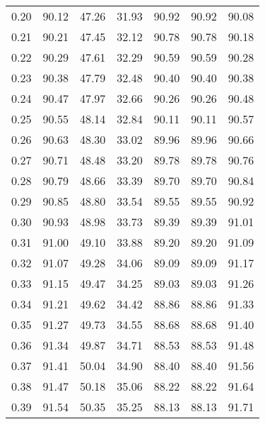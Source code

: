 \begin{tabular}{|c|c|c|c|c|c|c|}
      0.20 &     90.12 &     47.26 &      31.93 &   90.92 &      90.92 &         90.08 \\
      0.21 &     90.21 &     47.45 &      32.12 &   90.78 &      90.78 &         90.18 \\
      0.22 &     90.29 &     47.61 &      32.29 &   90.59 &      90.59 &         90.28 \\
      0.23 &     90.38 &     47.79 &      32.48 &   90.40 &      90.40 &         90.38 \\
      0.24 &     90.47 &     47.97 &      32.66 &   90.26 &      90.26 &         90.48 \\
      0.25 &     90.55 &     48.14 &      32.84 &   90.11 &      90.11 &         90.57 \\
      0.26 &     90.63 &     48.30 &      33.02 &   89.96 &      89.96 &         90.66 \\
      0.27 &     90.71 &     48.48 &      33.20 &   89.78 &      89.78 &         90.76 \\
      0.28 &     90.79 &     48.66 &      33.39 &   89.70 &      89.70 &         90.84 \\
      0.29 &     90.85 &     48.80 &      33.54 &   89.55 &      89.55 &         90.92 \\
      0.30 &     90.93 &     48.98 &      33.73 &   89.39 &      89.39 &         91.01 \\
      0.31 &     91.00 &     49.10 &      33.88 &   89.20 &      89.20 &         91.09 \\
      0.32 &     91.07 &     49.28 &      34.06 &   89.09 &      89.09 &         91.17 \\
      0.33 &     91.15 &     49.47 &      34.25 &   89.03 &      89.03 &         91.26 \\
      0.34 &     91.21 &     49.62 &      34.42 &   88.86 &      88.86 &         91.33 \\
      0.35 &     91.27 &     49.73 &      34.55 &   88.68 &      88.68 &         91.40 \\
      0.36 &     91.34 &     49.87 &      34.71 &   88.53 &      88.53 &         91.48 \\
      0.37 &     91.41 &     50.04 &      34.90 &   88.40 &      88.40 &         91.56 \\
      0.38 &     91.47 &     50.18 &      35.06 &   88.22 &      88.22 &         91.64 \\
      0.39 &     91.54 &     50.35 &      35.25 &   88.13 &      88.13 &         91.71 \\

\end{tabular}
